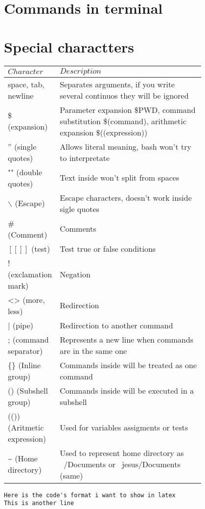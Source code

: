 \documentclass{article}
\begin{document}
\tableofcontents

\section{Commands in terminal}

\section{Special charactters}
\begin{tabular}{|l|p{0.8\linewidth}|} \hline
$Character$ & $Description$ \\ \hline
	space, tab, newline & Separates arguments, if you write several continuos they will be ignored \\
	\$ (expansion) & Parameter expansion \$PWD, command substitution \$(command), arithmetic expansion \$((expression))\\
	'' (single quotes) & Allows literal meaning, bash won't try to interpretate \\
	"" (double quotes) & Text inside won't split from spaces \\
	$\backslash$ (Escape) & Escape characters, doesn't work inside sigle quotes \\
	\# (Comment) & Comments \\
	$[[]]$ (test) & Test true or false conditions \\
	! (exclamation mark) & Negation \\
	<> (more, less) & Redirection \\
	| (pipe) & Redirection to another command \\
	; (command separator) & Represents a new line when commands are in the same one \\
	\{\} (Inline group) & Commands inside will be treated as one command \\
	() (Subshell group) & Commands inside will be executed in a subshell \\
	(()) (Aritmetic expression) & Used for variables assigments or tests \\
	\~{} (Home directory) & Used to represent home directory as ~/Documents or ~jesus/Documents (same) \\
	\hline
\end{tabular}

\begin{lstlisting}[caption=Something]
Here is the code's format i want to show in latex
This is another line
\end{lstlisting}
\end{document}
